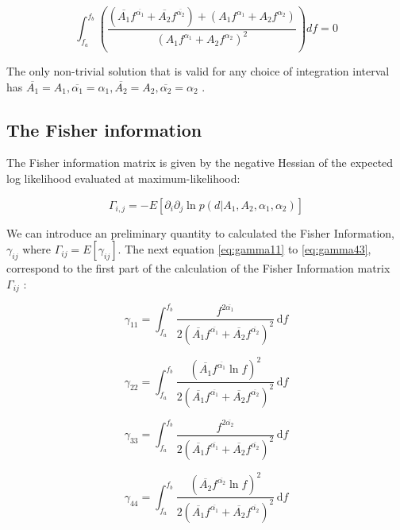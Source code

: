 \documentclass[a4paper,12pt]{article}
\begin{document}
\begin{equation}
    \int_{f_a}^{f_b} \left( \frac{(\overline{A_1}f^{\overline{\alpha_1}} + \overline{A_2}f^{\overline{\alpha_2}}) + (A_1f^{\alpha_1} + A_2f^{\alpha_2}) }{(A_1f^{\alpha_1} + A_2f^{\alpha_2})^2} \right) df = 0
\end{equation}

The only non-trivial solution that is valid for any choice of integration interval has $\overline{A_1} = A_1 , \overline{\alpha_1} = \alpha_1, \overline{A_2} = A_2 , \overline{\alpha_2} = \alpha_2$ . 

\subsection{The Fisher information}
The Fisher information matrix is given by the negative Hessian of the
expected log likelihood evaluated at maximum-likelihood:

\begin{equation}
    \Gamma_{i,j} = -E[\partial_i \partial_j \ln p(d|A_1,A_2,\alpha_1,\alpha_2)]  \label{Fisher}
\end{equation}

We can introduce an preliminary quantity to calculated the Fisher Information, $\gamma_{ij}$ where $\Gamma_{ij} = E[\gamma_{ij}]$. The next equation \ref{eq:gamma11} to \ref{eq:gamma43}, correspond to the first part of the calculation of the Fisher Information matrix $\Gamma_{ij}$ :

\begin{equation}\label{eq:gamma11}
    \gamma_{11} =  \int_{f_a}^{f_b} \frac{ f^{2 \overline{ \alpha_1}}}{2(\overline{A_1}f^{\overline{ \alpha_1}} +\overline{A_2}f^{\overline{ \alpha_2}})^2} \, \mathrm{d}f 
\end{equation}

\begin{equation}
    \gamma_{22} = \int_{f_a}^{f_b} \frac{ (\overline{A_1}f^{\overline{ \alpha_1}} \ln f )^2}{2(\overline{A_1}f^{\overline{ \alpha_1}} +\overline{A_2}f^{\overline{ \alpha_2}})^2} \, \mathrm{d}f 
\end{equation}

\begin{equation}\label{eq:gamma33}
    \gamma_{33} =  \int_{f_a}^{f_b} \frac{ f^{2 \overline{ \alpha_2}}}{2(\overline{A_1}f^{\overline{ \alpha_1}} +\overline{A_2}f^{\overline{ \alpha_2}})^2} \, \mathrm{d}f 
\end{equation}

\begin{equation}
    \gamma_{44} = \int_{f_a}^{f_b} \frac{ (\overline{A_2}f^{\overline{ \alpha_2}} \ln f )^2}{2(\overline{A_1}f^{\overline{ \alpha_1}} +\overline{A_2}f^{\overline{ \alpha_2}})^2} \, \mathrm{d}f 
\end{equation}
\end{document}
